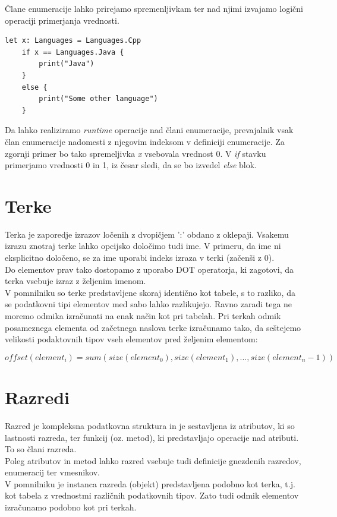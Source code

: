 \documentclass[a4paper, 12pt]{book}
\begin{document}
Člane enumeracije lahko prirejamo spremenljivkam ter nad njimi izvajamo logični operaciji primerjanja vrednosti. 

\begin{lstlisting}[caption={}, captionpos=b]
	let x: Languages = Languages.Cpp
	if x == Languages.Java {
	    print("Java")
	}
	else {
	    print("Some other language")
	}
\end{lstlisting}

Da lahko realiziramo \textit{runtime} operacije nad člani enumeracije, prevajalnik vsak član enumeracije nadomesti z njegovim indeksom v definiciji enumeracije. Za zgornji primer bo tako spremeljivka \textit{x} vsebovala vrednost 0. V \textit{if} stavku primerjamo vrednosti 0 in 1, iz česar sledi, da se bo izvedel \textit{else} blok.

\newpage
\section{Terke}

Terka je zaporedje izrazov ločenih z dvopičjem ':' obdano z oklepaji. Vsakemu izrazu znotraj terke lahko opcijsko določimo tudi ime. V primeru, da ime ni eksplicitno določeno, se za ime uporabi indeks izraza v terki (začenši z 0). \\
\indent Do elementov prav tako dostopamo z uporabo DOT operatorja, ki zagotovi, da terka vsebuje izraz z željenim imenom.\\
\indent V pomnilniku so terke predstavljene skoraj identično kot tabele, s to razliko, da se podatkovni tipi elementov med sabo lahko razlikujejo. Ravno zaradi tega ne moremo odmika izračunati na enak način kot pri tabelah. Pri terkah odmik posameznega elementa od začetnega naslova terke izračunamo tako, da seštejemo velikosti podaktovnih tipov vseh elementov pred željenim elementom:

\[ offset ( element_i )  = sum ( size ( element_0 ), size( element_1 ), ..., size ( element_n-1)) \]

\section{Razredi}

Razred je kompleksna podatkovna struktura in je sestavljena iz atributov, ki so lastnosti razreda, ter funkcij (oz. metod), ki predstavljajo operacije nad atributi. To so člani razreda.  \\
\indent Poleg atributov in metod lahko razred vsebuje tudi definicije gnezdenih razredov, enumeracij ter vmesnikov.\\
\indent V pomnilniku je instanca razreda (objekt) predstavljena podobno kot terka, t.j. kot tabela z vrednostmi različnih podatkovnih tipov. Zato tudi odmik elementov izračunamo podobno kot pri terkah.
\newpage
\end{document}

